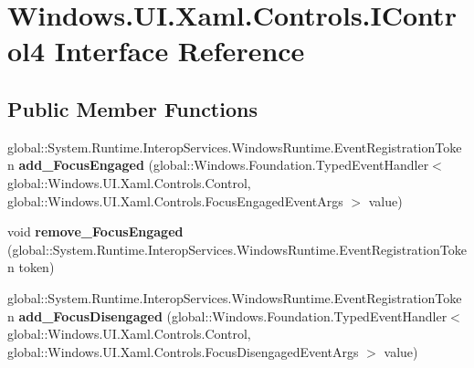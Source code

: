 \hypertarget{interface_windows_1_1_u_i_1_1_xaml_1_1_controls_1_1_i_control4}{}\section{Windows.\+U\+I.\+Xaml.\+Controls.\+I\+Control4 Interface Reference}
\label{interface_windows_1_1_u_i_1_1_xaml_1_1_controls_1_1_i_control4}
\subsection*{Public Member Functions}
\begin{DoxyCompactItemize}
\item 
\mbox{\label{interface_windows_1_1_u_i_1_1_xaml_1_1_controls_1_1_i_control4_aace904cbad444f4b1b7a2a18d9a214b9}} 
global\+::\+System.\+Runtime.\+Interop\+Services.\+Windows\+Runtime.\+Event\+Registration\+Token {\bfseries add\+\_\+\+Focus\+Engaged} (global\+::\+Windows.\+Foundation.\+Typed\+Event\+Handler$<$ global\+::\+Windows.\+U\+I.\+Xaml.\+Controls.\+Control, global\+::\+Windows.\+U\+I.\+Xaml.\+Controls.\+Focus\+Engaged\+Event\+Args $>$ value)
\item 
\mbox{\label{interface_windows_1_1_u_i_1_1_xaml_1_1_controls_1_1_i_control4_a382ea6b14878ea7b5e2b4ba178cd1018}} 
void {\bfseries remove\+\_\+\+Focus\+Engaged} (global\+::\+System.\+Runtime.\+Interop\+Services.\+Windows\+Runtime.\+Event\+Registration\+Token token)
\item 
\mbox{\label{interface_windows_1_1_u_i_1_1_xaml_1_1_controls_1_1_i_control4_a680a8edc30b4ba72807571ed0e1513ee}} 
global\+::\+System.\+Runtime.\+Interop\+Services.\+Windows\+Runtime.\+Event\+Registration\+Token {\bfseries add\+\_\+\+Focus\+Disengaged} (global\+::\+Windows.\+Foundation.\+Typed\+Event\+Handler$<$ global\+::\+Windows.\+U\+I.\+Xaml.\+Controls.\+Control, global\+::\+Windows.\+U\+I.\+Xaml.\+Controls.\+Focus\+Disengaged\+Event\+Args $>$ value)
\item 
\mbox{\label{interface_windows_1_1_u_i_1_1_xaml_1_1_controls_1_1_i_control4_ae123018ef2852af850d529f171eb60f3}} 

\end{DoxyCompactItemize}
